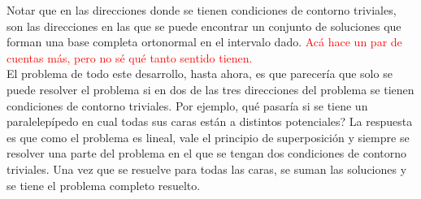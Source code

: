 \indent Notar que en las direcciones donde se tienen condiciones de contorno triviales, son las direcciones en las que se puede encontrar un conjunto de soluciones que forman una base completa ortonormal en el intervalo dado.
\textcolor{red}{Acá hace un par de cuentas más, pero no sé qué tanto sentido tienen.}\\
\indent El problema de todo este desarrollo, hasta ahora, es que parecería que solo se puede resolver el problema si en dos de las tres direcciones del problema se tienen condiciones de contorno triviales. Por ejemplo, qué pasaría si se tiene un paralelepípedo en cual todas sus caras están a distintos potenciales? La respuesta es que como el problema es lineal, vale el principio de superposición y siempre se resolver una parte del problema en el que se tengan dos condiciones de contorno triviales. Una vez que se resuelve para todas las caras, se suman las soluciones y se tiene el problema completo resuelto.





